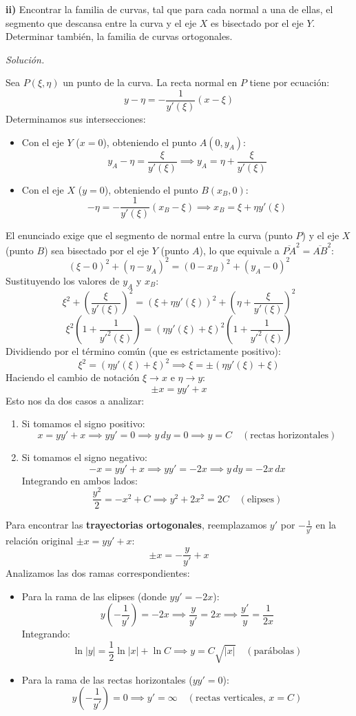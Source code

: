 \documentclass[12pt,letterpaper]{article}
\begin{document}
\medskip
\textbf{ii)} Encontrar la familia de curvas, tal que para cada normal a una de ellas, el segmento que descansa entre la curva y el eje $X$ es bisectado por el eje $Y$. Determinar también, la familia de curvas ortogonales.

\medskip
\textit{Solución.}

Sea $P(\xi, \eta)$ un punto de la curva. La recta normal en $P$ tiene por ecuación:
\[
  y - \eta = -\frac{1}{y'(\xi)}(x - \xi)
\]
Determinamos sus intersecciones:
\begin{itemize}
  \item Con el eje $Y$ ($x = 0$), obteniendo el punto $A(0, y_A)$:
  \[
    y_A - \eta = \frac{\xi}{y'(\xi)} \implies y_A = \eta + \frac{\xi}{y'(\xi)}
  \]
  \item Con el eje $X$ ($y = 0$), obteniendo el punto $B(x_B, 0)$:
  \[
    -\eta = -\frac{1}{y'(\xi)}(x_B - \xi) \implies x_B = \xi + \eta y'(\xi)
  \]
\end{itemize}
El enunciado exige que el segmento de normal entre la curva (punto $P$) y el eje $X$ (punto $B$) sea bisectado por el eje $Y$ (punto $A$), lo que equivale a $\overline{PA}^2 = \overline{AB}^2$:
\[
  (\xi - 0)^2 + (\eta - y_A)^2 = (0 - x_B)^2 + (y_A - 0)^2
\]
Sustituyendo los valores de $y_A$ y $x_B$:
\[
  \xi^2 + \left( \frac{\xi}{y'(\xi)} \right)^2 = (\xi + \eta y'(\xi))^2 + \left( \eta + \frac{\xi}{y'(\xi)} \right)^2
\]
\[
  \xi^2 \left( 1 + \frac{1}{y'^2(\xi)} \right) = (\eta y'(\xi) + \xi)^2 \left( 1 + \frac{1}{y'^2(\xi)} \right)
\]
Dividiendo por el término común (que es estrictamente positivo):
\[
  \xi^2 = (\eta y'(\xi) + \xi)^2 \implies \xi = \pm (\eta y'(\xi) + \xi)
\]
Haciendo el cambio de notación $\xi \to x$ e $\eta \to y$:
\[
  \pm x = y y' + x
\]
Esto nos da dos casos a analizar:
\begin{enumerate}[label=\alph*)]
  \item Si tomamos el signo positivo:
  \[
    x = y y' + x \implies y y' = 0 \implies y\,dy = 0 \implies y = C \quad (\text{rectas horizontales})
  \]
  \item Si tomamos el signo negativo:
  \[
    -x = y y' + x \implies y y' = -2x \implies y\,dy = -2x\,dx
  \]
  Integrando en ambos lados:
  \[
    \frac{y^2}{2} = -x^2 + C \implies y^2 + 2x^2 = 2C \quad (\text{elipses})
  \]
\end{enumerate}

Para encontrar las \textbf{trayectorias ortogonales}, reemplazamos $y'$ por $-\frac{1}{y'}$ en la relación original $\pm x = y y' + x$:
\[
  \pm x = -\frac{y}{y'} + x
  \]
  Analizamos las dos ramas correspondientes:
  \begin{itemize}
    \item Para la rama de las elipses (donde $y y' = -2x$):
    \[
      y \left( -\frac{1}{y'} \right) = -2x \implies \frac{y}{y'} = 2x \implies \frac{y'}{y} = \frac{1}{2x}
    \]
    Integrando:
    \[
      \ln|y| = \frac{1}{2}\ln|x| + \ln C \implies y = C\sqrt{|x|} \quad (\text{parábolas})
    \]
    \item Para la rama de las rectas horizontales ($y y' = 0$):
    \[
      y \left( -\frac{1}{y'} \right) = 0 \implies y' = \infty \quad (\text{rectas verticales, } x = C)
    \]
  \end{itemize}
\end{document}
